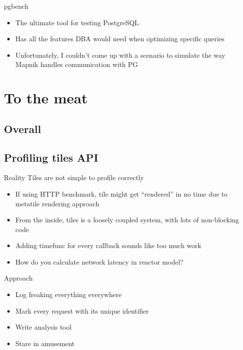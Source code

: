\documentclass[16pt]{beamer}
\begin{document}
\begin{frame}{pgbench}
  \begin{itemize}
  \item The ultimate tool for testing PostgreSQL
  \item Has all the features DBA would need when optimizing specific queries
  \item Unfortunately, I couldn't come up with a scenario to simulate the way Mapnik handles communication with PG
  \end{itemize}
\end{frame}

\section{To the meat}

\subsection{Overall}

\subsection{Profiling tiles API}

\begin{frame}{Reality}
  Tiles are not simple to profile correctly
  \begin{itemize}
  \item If using HTTP benchmark, tile might get ``rendered'' in no time due to metatile rendering approach
  \item From the inside, tiles is a loosely coupled system, with lots of non-blocking code
  \item Adding timefunc for every callback sounds like too much work
  \item How do you calculate network latency in reactor model?
  \end{itemize}
\end{frame}

\begin{frame}{Approach}
  \begin{itemize}
  \item Log freaking everything everywhere
  \item Mark every request with its unique identifier
  \item Write analysis tool
  \item Stare in amusement
  \end{itemize}
\end{frame}
\end{document}
